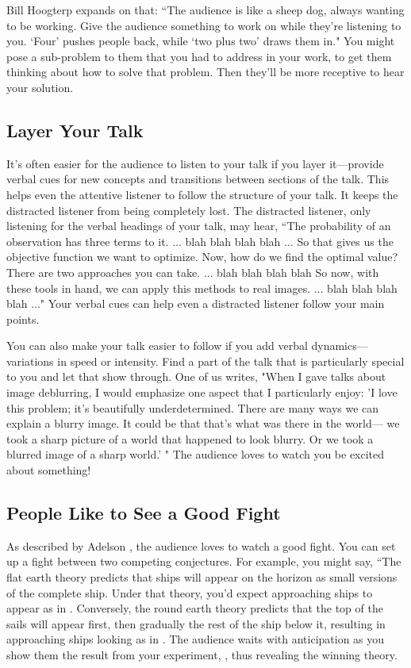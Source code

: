 Bill Hoogterp \cite{Hoogterp} expands on that:  
``The audience is like a sheep dog, always wanting to be working.  Give the audience something to work on while they're listening to you. `Four' pushes people back, while `two plus two' draws them in."  You might pose a sub-problem to them that you had to address in your work, to get them thinking about how to solve that problem.  Then they'll be more receptive to hear your solution.

\subsection{Layer Your Talk}
It's often easier for the audience to listen to your talk if you layer it---provide verbal cues for new concepts and transitions between sections of the talk.  This helps even the attentive listener to follow the structure of your talk.  It keeps the distracted listener from being completely lost.  The distracted listener, only listening for the verbal headings of your talk, may hear,
``The probability of an observation has three terms to it.  $\ldots$ blah blah blah blah $\ldots$
So that gives us the objective function we want to optimize.  Now, how do we find the optimal value?  There are two approaches you can take.  $\ldots$ blah blah blah blah 
So now, with these tools in hand, we can apply this methods to real images. $\ldots$ blah blah blah blah $\ldots$"
Your verbal cues can help even a distracted listener follow your main points.

You can also make your talk easier to follow if you add verbal dynamics---variations in speed or intensity.  Find a part of the talk that is particularly special to you and let that show through.  One of us writes, "When I gave talks about image deblurring, I would emphasize one aspect that I particularly enjoy:
'I love this problem;  it’s beautifully underdetermined.  There are many ways we can explain a blurry image.  It could be that that’s what was there in the world--- we took a sharp picture of a world that happened to look blurry.  Or we took a blurred image of a sharp world.' " The audience loves to watch you be excited about something!


\subsection{People Like to See a Good Fight}

As described by Adelson \cite{Adelson95}, the audience loves to watch a good fight.  You can set up a fight between two competing conjectures.  For example, you might say, ``The flat earth theory predicts that ships will appear on the horizon as small versions of the complete ship.  Under that theory, you’d expect approaching ships to appear as in .  Conversely, the round earth theory predicts that the top of the sails will appear first, then gradually the rest of the ship below it, resulting in approaching ships looking as in .  The audience waits with anticipation as you show them the result from your experiment, , thus revealing the winning theory.

